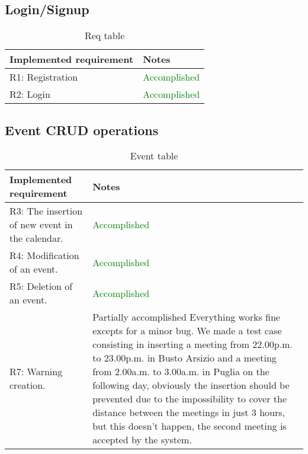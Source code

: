 \subsection{Login/Signup}

\begin{flushleft}

\begin{table}[htp]

\begin{tabular}{p{7cm}|p{7cm}}
 Implemented requirement&Notes\\
\hline
\hline
R1: Registration&\textcolor{green}{Accomplished}\\
\hline
R2: Login&\textcolor{green}{Accomplished}\\
\hline

\end{tabular}

\caption{Req table } 
\label{tab:Reqtable}

\end{table}

\end{flushleft}



\subsection{Event CRUD operations}

\begin{flushleft}
	
	\begin{table}[htp]
		
		\begin{tabular}{p{7cm}|p{7cm}}
			Implemented requirement&Notes\\
			\hline
			\hline

R3: The insertion of new event in the calendar. & \textcolor{green}{Accomplished}\\
\hline
R4: Modification of an event. & \textcolor{green}{Accomplished}\\
\hline
R5: Deletion of an event. & \textcolor{green}{Accomplished}\\
\hline
R7: Warning creation. & \textcolor{BurntOrange}{Partially accomplished} Everything works fine excepts for a minor bug. We made a test case consisting in inserting a meeting from 22.00p.m. to 23.00p.m. in Busto Arsizio and a meeting from 2.00a.m. to 3.00a.m. in Puglia on the following day, obviously the insertion should be prevented due to the impossibility to cover the distance between the meetings in just 3 hours, but this doesn't happen, the second meeting is accepted by the system.  \\
\hline

\end{tabular}

\caption{Event table } 
\label{tab:Eventtable}

\end{table}

\end{flushleft}



